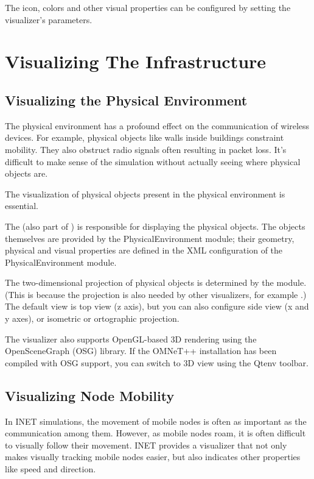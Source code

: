 The icon, colors and other visual properties can be configured by setting the
visualizer's parameters.


\section{Visualizing The Infrastructure}
\label{sec:visualization:the-infrastructure}

\subsection{Visualizing the Physical Environment}
\label{sec:visualization:the-physical-environment}

The physical environment has a profound effect on the communication of wireless
devices. For example, physical objects like walls inside buildings constraint
mobility. They also obstruct radio signals often resulting in packet loss. It's
difficult to make sense of the simulation without actually seeing where physical
objects are.

The visualization of physical objects present in the physical environment is
essential.

The  (also part of ) is
responsible for displaying the physical objects. The objects themselves are
provided by the PhysicalEnvironment module; their geometry, physical and visual
properties are defined in the XML configuration of the PhysicalEnvironment
module.

The two-dimensional projection of physical objects is determined by the
 module. (This is because the projection is also needed by
other visualizers, for example .) The default view is top view
(z axis), but you can also configure side view (x and y axes), or isometric or
ortographic projection.

The visualizer also supports OpenGL-based 3D rendering using the OpenSceneGraph
(OSG) library. If the OMNeT++ installation has been compiled with OSG
support, you can switch to 3D view using the Qtenv toolbar.

\subsection{Visualizing Node Mobility}
\label{sec:visualization:node-mobility}

In INET simulations, the movement of mobile nodes is often as important as the
communication among them. However, as mobile nodes roam, it is often difficult
to visually follow their movement. INET provides a visualizer that not only
makes visually tracking mobile nodes easier, but also indicates other properties
like speed and direction.

